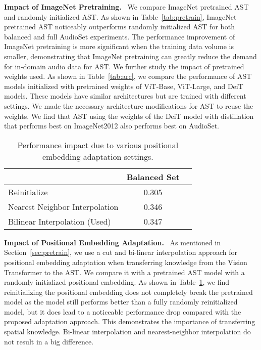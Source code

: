 \documentclass[a4paper]{article}
\begin{document}
\newcommand{\myparagraph}[1]{\vspace{.4em} \noindent \textbf{#1}\ }
\myparagraph{Impact of ImageNet Pretraining.} We compare ImageNet pretrained AST and randomly initialized AST. As shown in Table~\ref{tab:pretrain}, ImageNet pretrained AST noticeably outperforms randomly initialized AST for both balanced and full AudioSet experiments. The performance improvement of ImageNet pretraining is more significant when the training data volume is smaller, demonstrating that ImageNet pretraining can greatly reduce the demand for in-domain audio data for AST. We further study the impact of pretrained weights used. As shown in Table~\ref{tab:arc}, we compare the performance of AST models initialized with pretrained weights of ViT-Base, ViT-Large, and DeiT models. These models have similar architectures but are trained with different settings. We made the necessary architecture modifications for AST to reuse the weights. We find that AST using the weights of the DeiT model with distillation that performs best on ImageNet2012 also performs best on AudioSet. 



\begin{table}[t]
\footnotesize
\centering
\caption{Performance impact due to various positional embedding adaptation settings.}
\label{tab:position}
\begin{tabular}{@{}lcc@{}}
\toprule
                                & Balanced Set  \\ \midrule
Reinitialize                         &     0.305                \\
Nearest Neighbor Interpolation                     &     0.346                \\
Bilinear Interpolation (Used)                      &     0.347                \\ \bottomrule
\end{tabular}
\end{table}

\myparagraph{Impact of Positional Embedding Adaptation.} As mentioned in Section~\ref{sec:pretrain}, we use a cut and bi-linear interpolation approach for positional embedding adaptation when transferring knowledge from the Vision Transformer to the AST. We compare it with a pretrained AST model with a randomly initialized positional embedding. As shown in Table~\ref{tab:position}, we find reinitializing the positional embedding does not completely break the pretrained model as the model still performs better than a fully randomly reinitialized model, but it does lead to a noticeable performance drop compared with the proposed adaptation approach. This demonstrates the importance of transferring spatial knowledge. Bi-linear interpolation and nearest-neighbor interpolation do not result in a big difference.
\end{document}
